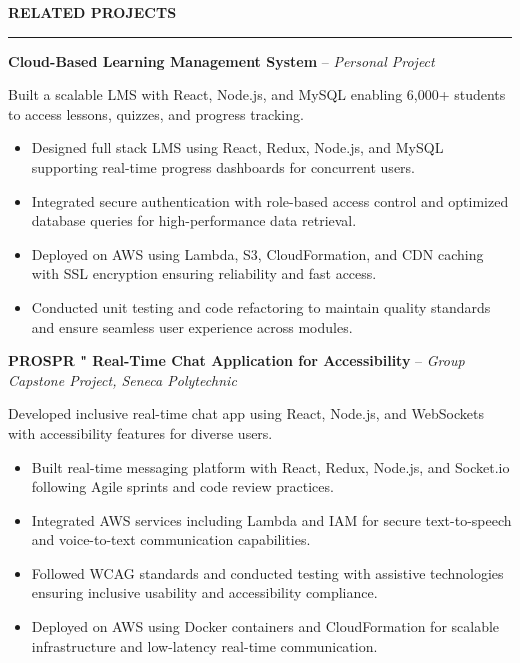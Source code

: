 \documentclass[10pt,letterpaper]{article}
\begin{document}
\vspace{6pt}

\textbf{RELATED PROJECTS}\\[-8pt]
\noindent\rule{\textwidth}{1pt}

\vspace{-2pt}

\textbf{Cloud-Based Learning Management System} -- \emph{Personal Project}

\vspace{-1pt}

Built a scalable LMS with React, Node.js, and MySQL enabling 6,000+ students to access lessons, quizzes, and progress tracking.
\vspace{-1pt}
\begin{itemize}
\item Designed full stack LMS using React, Redux, Node.js, and MySQL supporting real-time progress dashboards for concurrent users.
\item Integrated secure authentication with role-based access control and optimized database queries for high-performance data retrieval.
\item Deployed on AWS using Lambda, S3, CloudFormation, and CDN caching with SSL encryption ensuring reliability and fast access.
\item Conducted unit testing and code refactoring to maintain quality standards and ensure seamless user experience across modules.
\end{itemize}

\textbf{PROSPR " Real-Time Chat Application for Accessibility} -- \emph{Group Capstone Project, Seneca Polytechnic}

\vspace{-1pt}

Developed inclusive real-time chat app using React, Node.js, and WebSockets with accessibility features for diverse users.
\vspace{-1pt}
\begin{itemize}
\item Built real-time messaging platform with React, Redux, Node.js, and Socket.io following Agile sprints and code review practices.
\item Integrated AWS services including Lambda and IAM for secure text-to-speech and voice-to-text communication capabilities.
\item Followed WCAG standards and conducted testing with assistive technologies ensuring inclusive usability and accessibility compliance.
\item Deployed on AWS using Docker containers and CloudFormation for scalable infrastructure and low-latency real-time communication.
\end{itemize}
\end{document}
